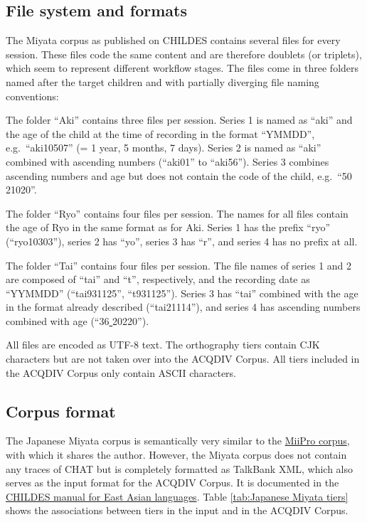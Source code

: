 \documentclass[a4paper, 11pt]{book}
\newcommand{\und}{\underline{{ }}\hspace{0.2mm}}	%
\begin{document}
\subsection{File system and formats}
\label{subsec:Miyata file system and formats}

The Miyata corpus as published on CHILDES contains several files for every session. These files code the same content and are therefore doublets (or triplets), which seem to represent different workflow stages. The files come in three folders named after the target children and with partially diverging file naming conventions: 

\begin{itemize*}
	\item The folder “Aki” contains three files per session. Series 1 is named as “aki” and the age of the child at the time of recording in the format “YMMDD”, 
		e.g.\ “aki10507” (= 1 year, 5 months, 7 days). Series 2 is named as “aki” combined with ascending numbers (“aki01” to “aki56”). Series 3 combines 
		ascending numbers and age but does not contain the code of the child, e.g.\ “50\und 21020”. 
	\item The folder “Ryo” contains four files per session. The names for all files contain the age of Ryo in the same format as for Aki. Series 1 has the 
		prefix “ryo” (“ryo10303”), series 2 has “yo”, series 3 has “r”, and series 4 has no prefix at all. 
	\item The folder “Tai” contains four files per session. The file names of series 1 and 2 are composed of “tai” and “t”, respectively, and the recording date 
		as “YYMMDD” (“tai931125”, “t931125”). Series 3 has “tai” combined with the age in the format already described (“tai21114”), and series 4 has 
		ascending numbers combined with age (“36\und 20220”). 
\end{itemize*}

All files are encoded as UTF-8 text. The orthography tiers contain CJK characters but are not taken over into the ACQDIV Corpus. All tiers included in the ACQDIV Corpus only contain ASCII characters. 


\subsection{Corpus format}

The Japanese Miyata corpus is semantically very similar to the \hyperref[sec:Japanese MiiPro]{MiiPro corpus}, with which it shares the author. However, the Miyata corpus does not contain any traces of CHAT but is completely formatted as TalkBank XML, which also serves as the input format for the ACQDIV Corpus. It is documented in the \href{http://childes.psy.cmu.edu/manuals/10eastasian.pdf}{CHILDES manual for East Asian languages}. Table \autoref{tab:Japanese Miyata tiers} shows the associations between tiers in the input and in the ACQDIV Corpus.
\end{document}
